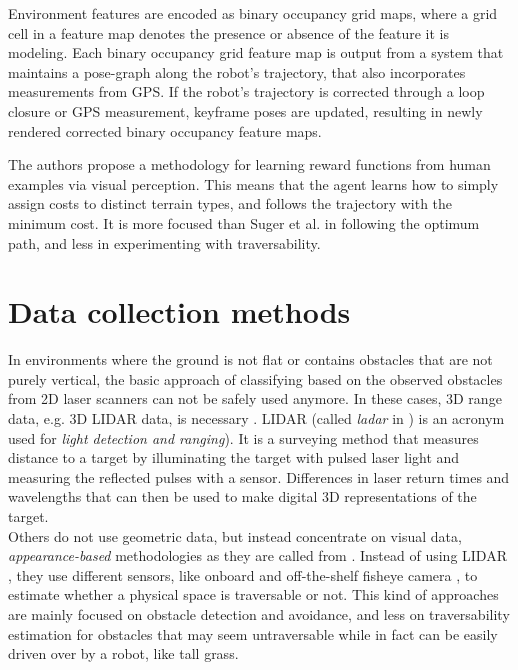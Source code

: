 \documentclass[12pt,a4paper]{report}
\newcommand{\term}{\textit}
\newcommand{\acronym}{\MakeUppercase}
\begin{document}
	Environment features are encoded as binary occupancy grid maps, where 
	a grid cell in a feature map denotes the presence or absence of the feature 
	it is modeling. Each binary occupancy grid feature map is output from a 
	system that maintains a pose-graph along the robot’s trajectory, that also 
	incorporates measurements from GPS. If the robot’s trajectory is corrected 
	through a loop closure or GPS measurement, keyframe poses are updated, 
	resulting in newly rendered corrected binary occupancy feature maps.
	
	The authors propose a methodology for learning reward functions from 
	human examples via visual perception. This means that the agent learns 
	how to simply assign costs to distinct terrain types, and follows the 
	trajectory with the minimum cost. It is more focused than Suger et al. in 
	following the optimum path, and less in experimenting with traversability.
	\\
	
	\section{Data collection methods}
	\label{sec:bg:data}
	
	In environments where the ground is not flat or contains obstacles that are 
	not purely vertical, the basic approach of classifying based on the observed 
	obstacles from \acronym{2d} laser scanners can not be safely used anymore. 
	In these cases, \acronym{3d} range data, e.g. \acronym{3d} \acronym{lidar} 
	data, is necessary \cite{Suger, Lalonde}. \acronym{lidar} (called \term{ladar} 
	in \cite{Lalonde}) is an acronym used for \term{light detection and ranging}). 
	It is a surveying method that measures distance to a target by illuminating 
	the target with pulsed laser light and measuring the reflected pulses with a 
	sensor. Differences in laser return times and wavelengths that can then be 
	used to make digital \acronym{3d} representations of the target.
	\\
	
	Others do not use geometric data, but instead concentrate on visual data, 
	\term{appearance-based} methodologies as they are called from \cite{Papadakis}. 
	Instead of using \acronym{lidar} \cite{Lalonde, Suger}, they use different 
	sensors, like onboard and off-the-shelf fisheye camera \cite{Hirose}, to 
	estimate whether a physical space is traversable or not. This kind of 
	approaches are mainly focused on obstacle detection and avoidance, and less 
	on traversability estimation for obstacles that may seem untraversable while 
	in fact can be easily driven over by a robot, like tall grass.
	\\
	
\end{document}
